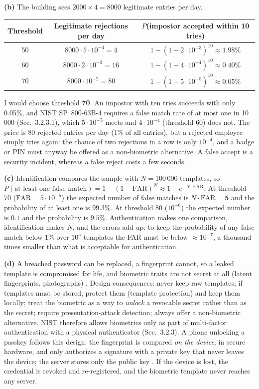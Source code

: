 \documentclass[11pt,a4paper]{article}
\begin{document}
\textbf{(b)} The building sees $2000\times 4=8000$ legitimate entries per day.
\begin{table}[H]
\centering\small
\begin{tabular}{@{}ccc@{}}
\toprule
Threshold & Legitimate rejections per day & $P$(impostor accepted within 10 tries) \\
\midrule
50 & $8000\cdot 5\cdot10^{-4}=4$ & $1-(1-2\cdot10^{-3})^{10}\approx 1.98\%$ \\
60 & $8000\cdot 2\cdot10^{-3}=16$ & $1-(1-4\cdot10^{-4})^{10}\approx 0.40\%$ \\
70 & $8000\cdot 10^{-2}=80$ & $1-(1-5\cdot10^{-5})^{10}\approx 0.05\%$ \\
\bottomrule
\end{tabular}
\end{table}
I would choose threshold \textbf{70}. An impostor with ten tries succeeds with only 0.05\%, and NIST
SP~800-63B-4 requires a false match rate of at most one in 10\,000 (Sec.~3.2.3.1), which $5\cdot10^{-5}$ meets and
$4\cdot10^{-4}$ (threshold 60) does not. The price is $80$ rejected entries per day (1\% of all entries), but a rejected employee
simply tries again: the chance of two rejections in a row is only $10^{-4}$, and a badge or PIN must anyway be
offered as a non-biometric alternative. A false accept is a security incident, whereas a false reject costs a few
seconds.

\textbf{(c)} Identification compares the sample with $N=100\,000$ templates, so
$P(\text{at least one false match})=1-(1-\mathrm{FAR})^{N}\approx 1-e^{-N\cdot \mathrm{FAR}}$. At threshold 70
($\mathrm{FAR}=5\cdot10^{-5}$) the expected number of false matches is $N\cdot\mathrm{FAR}=\mathbf{5}$ and the
probability of at least one is $\mathbf{99.3\%}$. At threshold 80 ($10^{-6}$) the expected number is $0.1$
and the probability is $\mathbf{9.5\%}$. Authentication makes one comparison, identification makes $N$, and the
errors add up: to keep the probability of any false match below $1\%$ over $10^{5}$ templates the FAR
must be below $\approx 10^{-7}$, a thousand times smaller than what is acceptable for authentication.

\textbf{(d)} A breached password can be replaced, a fingerprint cannot, so a leaked template is compromised for
life, and biometric traits are not secret at all (latent fingerprints, photographs) \cite{nist63b4}. Design
consequences: never keep raw templates; if templates must be stored, protect them (template protection) and
keep them locally; treat the biometric as a way to \emph{unlock} a revocable secret rather than as the secret;
require presentation-attack detection; always offer a non-biometric alternative. NIST therefore allows biometrics
only as part of multi-factor authentication with a physical authenticator (Sec.~3.2.3). A phone unlocking a
passkey follows this design: the fingerprint is compared \emph{on the device}, in secure hardware, and only
authorizes a signature with a private key that never leaves the device; the server stores only the public key
\cite{webauthn}. If the device is lost, the credential is revoked and re-registered, and the biometric template
never reaches any server.
\end{document}
